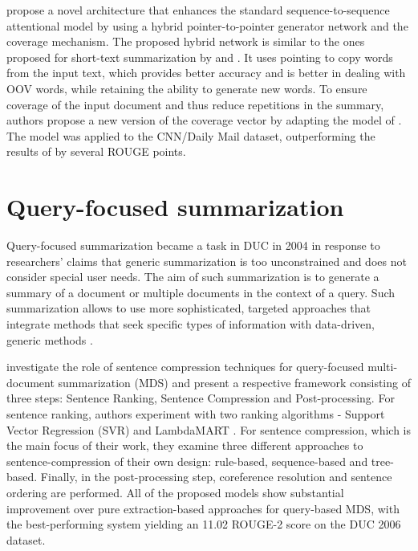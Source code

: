 \documentclass[11pt,a4paper,onecolumn]{article}
\begin{document}
\cite{see2017get} propose a novel architecture that enhances the standard sequence-to-sequence attentional model by using a hybrid pointer-to-pointer generator network and the coverage mechanism.
The proposed hybrid network is similar to the ones proposed for short-text summarization by \cite{gu2016incorporating} and \cite{miao2016language}.
It uses pointing \cite{vinyals2015pointer} to copy words from the input text, which provides better accuracy and is better in dealing with OOV words, while retaining the ability to generate new words.
To ensure coverage of the input document and thus reduce repetitions in the summary, authors propose a new version of the coverage vector by adapting the model of \cite{tu2016modeling}.
The model was applied to the CNN/Daily Mail dataset, outperforming the results of \cite{nallapati2016abstractive} by several ROUGE points.

\section{Query-focused summarization}
Query-focused summarization became a task in DUC in 2004 in response to researchers' claims that generic summarization is too unconstrained and does not consider special user needs.
The aim of such summarization is to generate a summary of a document or multiple documents in the context of a query.
Such summarization allows to use more sophisticated, targeted approaches that integrate methods that seek specific types of information with data-driven, generic methods \cite{nenkova2011automatic}.

\cite{wang2016sentence} investigate the role of sentence compression techniques for query-focused multi-document summarization (MDS) and present a respective framework consisting of three steps: Sentence Ranking, Sentence Compression and Post-processing.
For sentence ranking, authors experiment with two ranking algorithms - Support Vector Regression (SVR) \cite{mozer1997} and LambdaMART \cite{burges2007learning}.
For sentence compression, which is the main focus of their work, they examine three different approaches to sentence-compression of their own design: rule-based, sequence-based and tree-based.
Finally, in the post-processing step, coreference resolution and sentence ordering are performed.
All of the proposed models show substantial improvement over pure extraction-based approaches for query-based MDS, with the best-performing system yielding an 11.02 ROUGE-2 score on the DUC 2006 dataset.
\end{document}
